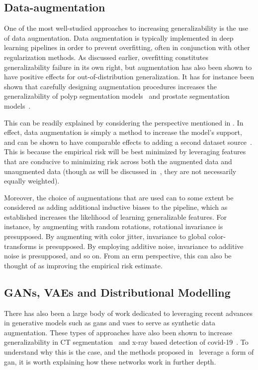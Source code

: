 \subsection{Data-augmentation}
One of the most well-studied approaches to increasing generalizability is the use of data augmentation. Data augmentation is typically
implemented in deep learning pipelines in order to prevent overfitting, often in conjunction with other regularization methods. As discussed earlier, overfitting constitutes generalizability failure in its own right, but augmentation has also been shown to have positive effects for out-of-distribution generalization. It has for instance been shown that carefully designing augmentation procedures increases the generalizability of polyp segmentation models~\cite{polyp_augmentation} and prostate segmentation models~\cite{augmentation_prostate}. 

This can be readily explained by considering the perspective mentioned in . In effect, data augmentation is simply a method to increase the model's support, and can be shown to have comparable effects to adding a second dataset source~\cite{generalization_datamod}. This is because the empirical risk will be best minimized by leveraging features that are conducive to minimizing risk across both the augmented data and unaugmented data (though as will be discussed in~, they are not necessarily equally weighted). 

Moreover, the choice of augmentations that are used can to some extent be considered as adding additional inductive biases to the pipeline, which as established increases the likelihood of learning generalizable features. For instance, by augmenting with random rotations, rotational invariance is presupposed. By augmenting with color jitter, invariance to global color-transforms is presupposed.  By employing additive noise, invariance to additive noise is presupposed, and so on. From an \gls{erm} perspective, this can also be thought of as improving the empirical risk estimate. 

\subsection{GANs, VAEs and Distributional Modelling}

There has also been a large body of work dedicated to leveraging recent advances in generative models such as \glspl{gan} and \glspl{vae} to serve as synthetic data augmentation. These types of approaches have also been shown to increase generalizability in CT segmentation~\cite{cyclegan} and x-ray based detection of covid-19~\cite{covid}. To understand why this is the case, and the methods proposed in~ leverage a form of \gls{gan}, it is worth explaining how these networks work in further depth.
